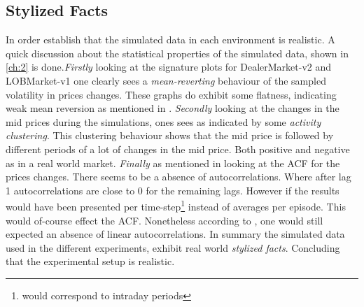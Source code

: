 \documentclass{kththesis}
\theoremstyle{definition}
\begin{document}
\subsection*{Stylized Facts}
In order establish that the simulated data in each environment is realistic. A quick discussion about the statistical properties of the simulated data, shown in \autoref{ch:2} is done.\textit{Firstly} looking at the signature plots for DealerMarket-v2 and LOBMarket-v1 one clearly sees a \textit{mean-reverting} behaviour of the sampled volatility in prices changes. These graphs do exhibit some flatness, indicating weak mean reversion as mentioned in \parencite{bouchaud2018trades}. \textit{Secondly} looking at the changes in the mid prices during the simulations, ones sees as indicated by \textcite{bouchaud2018trades} some \textit{activity clustering}. 
\newline
\newline
This clustering behaviour shows that the mid price is followed by different periods of a lot of changes in the mid price. Both positive and negative as in a real world market. \textit{Finally} as mentioned in \parencite{cont2001empirical} looking at the ACF for the prices changes. There seems to be a absence of autocorrelations. Where after lag 1 autocorrelations are close to 0 for the remaining lags. However if the results would have been presented per time-step\footnote{would correspond to intraday periods} instead of averages per episode. This would of-course effect the ACF. Nonetheless according to \textcite{cont2001empirical}, one would still expected an absence of linear autocorrelations. In summary the simulated data used in the different experiments, exhibit real world \textit{stylized facts}. Concluding that the experimental setup is realistic.
\end{document}
